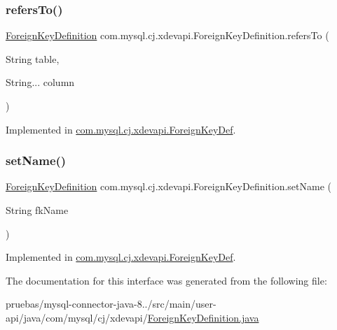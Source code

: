 \subsubsection{\texorpdfstring{refers\+To()}{refersTo()}}
{\footnotesize\ttfamily \mbox{\hyperlink{interfacecom_1_1mysql_1_1cj_1_1xdevapi_1_1_foreign_key_definition}{Foreign\+Key\+Definition}} com.\+mysql.\+cj.\+xdevapi.\+Foreign\+Key\+Definition.\+refers\+To (\begin{DoxyParamCaption}\item[{String}]{table,  }\item[{String...}]{column }\end{DoxyParamCaption})}



Implemented in \mbox{\hyperlink{classcom_1_1mysql_1_1cj_1_1xdevapi_1_1_foreign_key_def_a0e7ccf961a3a7bbf2d86a9b5765645d5}{com.\+mysql.\+cj.\+xdevapi.\+Foreign\+Key\+Def}}.

\mbox{\label{interfacecom_1_1mysql_1_1cj_1_1xdevapi_1_1_foreign_key_definition_a463ad3b32013c0394c4bb428a70fd247}} 
\subsubsection{\texorpdfstring{set\+Name()}{setName()}}
{\footnotesize\ttfamily \mbox{\hyperlink{interfacecom_1_1mysql_1_1cj_1_1xdevapi_1_1_foreign_key_definition}{Foreign\+Key\+Definition}} com.\+mysql.\+cj.\+xdevapi.\+Foreign\+Key\+Definition.\+set\+Name (\begin{DoxyParamCaption}\item[{String}]{fk\+Name }\end{DoxyParamCaption})}



Implemented in \mbox{\hyperlink{classcom_1_1mysql_1_1cj_1_1xdevapi_1_1_foreign_key_def_a39b5a6f9c5dc4307b38a87109cd4784d}{com.\+mysql.\+cj.\+xdevapi.\+Foreign\+Key\+Def}}.



The documentation for this interface was generated from the following file\+:\begin{DoxyCompactItemize}
\item 
pruebas/mysql-\/connector-\/java-\/8../src/main/user-\/api/java/com/mysql/cj/xdevapi/\mbox{\hyperlink{_foreign_key_definition_8java}{Foreign\+Key\+Definition.\+java}}\end{DoxyCompactItemize}
